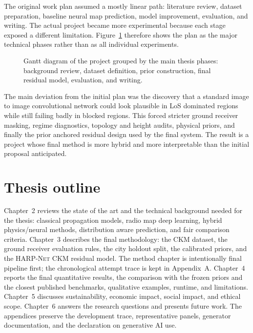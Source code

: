 The original work plan assumed a mostly linear path: literature review, dataset
preparation, baseline neural map prediction, model improvement, evaluation, and
writing. The actual project became more experimental because each stage exposed
a different limitation. Figure~\ref{fig:gantt} therefore shows the plan as the
major technical phases rather than as all individual experiments.

\begin{figure}[ht]
  \centering
  
  \caption[Project's Gantt diagram]{Gantt diagram of the project grouped by
  the main thesis phases: background review, dataset definition, prior
  construction, final residual model, evaluation, and writing.}
  \label{fig:gantt}
\end{figure}

The main deviation from the initial plan was the discovery that a standard
image to image convolutional network could look plausible in LoS dominated
regions while still failing badly in blocked regions. This forced stricter
ground receiver masking, regime diagnostics, topology and height audits,
physical priors, and finally the prior anchored residual design used by the
final system. The result is a project whose final method is more hybrid and
more interpretable than the initial proposal anticipated.

\section{Thesis outline}

Chapter~2 reviews the state of the art and the technical background needed for
the thesis: classical propagation models, radio map deep learning, hybrid
physics/neural methods, distribution aware prediction, and fair comparison
criteria. Chapter~3 describes the final methodology: the CKM dataset, the
ground receiver evaluation rules, the city holdout split, the calibrated
priors, and the \textsc{HARP-Net CKM} residual model. The method chapter is
intentionally final pipeline first; the chronological attempt trace is kept in
Appendix~A. Chapter~4 reports the final quantitative results, the comparison
with the frozen priors and the closest published benchmarks, qualitative
examples, runtime, and limitations. Chapter~5 discusses sustainability,
economic impact, social impact, and ethical scope. Chapter~6 answers the
research questions and presents future work. The appendices preserve the
development trace, representative panels, generator documentation, and the
declaration on generative AI use.

